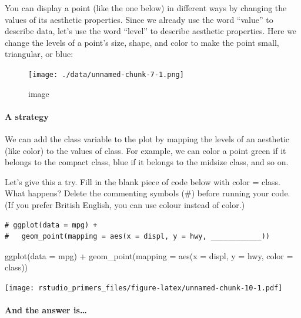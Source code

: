 \documentclass[
]{article}
\newenvironment{Shaded}{\begin{snugshade}}{\end{snugshade}}
\newcommand{\AttributeTok}[1]{\textcolor[rgb]{0.77,0.63,0.00}{#1}}
\newcommand{\FunctionTok}[1]{\textcolor[rgb]{0.00,0.00,0.00}{#1}}
\newcommand{\NormalTok}[1]{#1}
\newcommand{\SpecialCharTok}[1]{\textcolor[rgb]{0.00,0.00,0.00}{#1}}
\begin{document}
You can display a point (like the one below) in different ways by
changing the values of its aesthetic properties. Since we already use
the word ``value'' to describe data, let's use the word ``level'' to
describe aesthetic properties. Here we change the levels of a point's
size, shape, and color to make the point small, triangular, or blue:

\begin{figure}
\centering
\texttt{[image: ./data/unnamed-chunk-7-1.png]}
\caption{image}
\end{figure}

\hypertarget{a-strategy}{%
\paragraph{A strategy}\label{a-strategy}}

We can add the class variable to the plot by mapping the levels of an
aesthetic (like color) to the values of class. For example, we can color
a point green if it belongs to the compact class, blue if it belongs to
the midsize class, and so on.

Let's give this a try. Fill in the blank piece of code below with color
= class. What happens? Delete the commenting symbols (\#) before running
your code. (If you prefer British English, you can use colour instead of
color.)

\begin{verbatim}
# ggplot(data = mpg) + 
#   geom_point(mapping = aes(x = displ, y = hwy, ____________))
\end{verbatim}

\begin{Shaded}
\begin{Highlighting}[]
\FunctionTok{ggplot}\NormalTok{(}\AttributeTok{data =}\NormalTok{ mpg) }\SpecialCharTok{+} 
   \FunctionTok{geom\_point}\NormalTok{(}\AttributeTok{mapping =} \FunctionTok{aes}\NormalTok{(}\AttributeTok{x =}\NormalTok{ displ, }\AttributeTok{y =}\NormalTok{ hwy, }\AttributeTok{color =}\NormalTok{ class))}
\end{Highlighting}
\end{Shaded}

\texttt{[image: rstudio\_primers\_files/figure-latex/unnamed-chunk-10-1.pdf]}

\hypertarget{and-the-answer-is-1}{%
\paragraph{And the answer is\ldots{}}\label{and-the-answer-is-1}}
\end{document}
